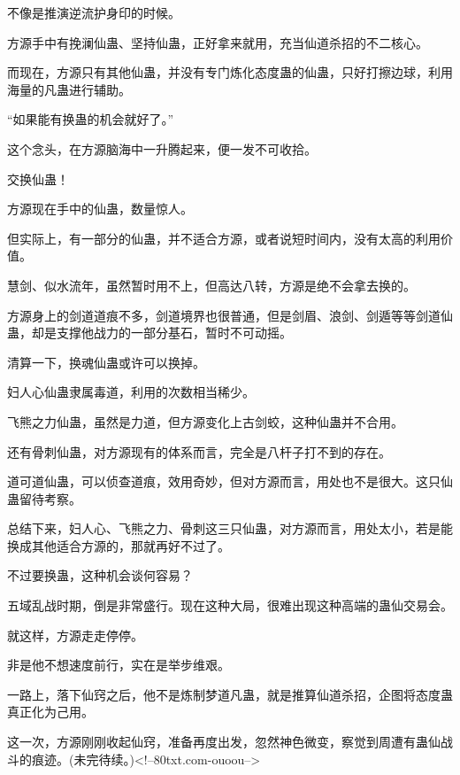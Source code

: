 \begin{this_body}
不像是推演逆流护身印的时候。

方源手中有挽澜仙蛊、坚持仙蛊，正好拿来就用，充当仙道杀招的不二核心。

而现在，方源只有其他仙蛊，并没有专门炼化态度蛊的仙蛊，只好打擦边球，利用海量的凡蛊进行辅助。

“如果能有换蛊的机会就好了。”

这个念头，在方源脑海中一升腾起来，便一发不可收拾。

交换仙蛊！

方源现在手中的仙蛊，数量惊人。

但实际上，有一部分的仙蛊，并不适合方源，或者说短时间内，没有太高的利用价值。

慧剑、似水流年，虽然暂时用不上，但高达八转，方源是绝不会拿去换的。

方源身上的剑道道痕不多，剑道境界也很普通，但是剑眉、浪剑、剑遁等等剑道仙蛊，却是支撑他战力的一部分基石，暂时不可动摇。

清算一下，换魂仙蛊或许可以换掉。

妇人心仙蛊隶属毒道，利用的次数相当稀少。

飞熊之力仙蛊，虽然是力道，但方源变化上古剑蛟，这种仙蛊并不合用。

还有骨刺仙蛊，对方源现有的体系而言，完全是八杆子打不到的存在。

道可道仙蛊，可以侦查道痕，效用奇妙，但对方源而言，用处也不是很大。这只仙蛊留待考察。

总结下来，妇人心、飞熊之力、骨刺这三只仙蛊，对方源而言，用处太小，若是能换成其他适合方源的，那就再好不过了。

不过要换蛊，这种机会谈何容易？

五域乱战时期，倒是非常盛行。现在这种大局，很难出现这种高端的蛊仙交易会。

就这样，方源走走停停。

非是他不想速度前行，实在是举步维艰。

一路上，落下仙窍之后，他不是炼制梦道凡蛊，就是推算仙道杀招，企图将态度蛊真正化为己用。

这一次，方源刚刚收起仙窍，准备再度出发，忽然神色微变，察觉到周遭有蛊仙战斗的痕迹。(未完待续。)<!--80txt.com-ouoou-->

\end{this_body}

